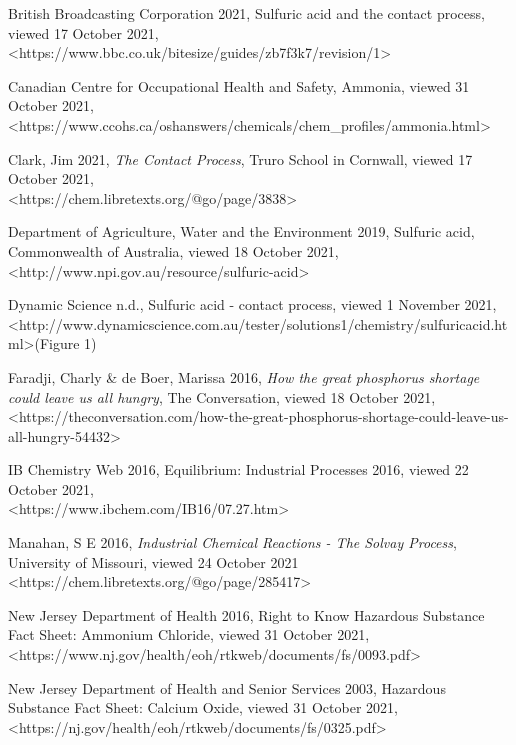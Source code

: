 \documentclass[12pt, a4paper]{article}
\begin{document}
British Broadcasting Corporation 2021, Sulfuric acid and the contact process, viewed 17 October 2021, \\ \textless{https://www.bbc.co.uk/bitesize/guides/zb7f3k7/revision/1}\textgreater

Canadian Centre for Occupational Health and Safety, Ammonia, viewed 31 October 2021, \\ \textless{https://www.ccohs.ca/oshanswers/chemicals/chem\_profiles/ammonia.html}\textgreater

Clark, Jim 2021, \emph{The Contact Process}, Truro School in Cornwall, viewed 17 October 2021, \\ \textless{https://chem.libretexts.org/@go/page/3838}\textgreater

Department of Agriculture, Water and the Environment 2019, Sulfuric acid, Commonwealth of Australia, viewed 18 October 2021, \textless{http://www.npi.gov.au/resource/sulfuric-acid}\textgreater

Dynamic Science n.d., Sulfuric acid - contact process, viewed 1 November 2021, \textless{http://www.dynamicscience.com.au/tester/solutions1/chemistry/sulfuricacid.html}\textgreater (Figure 1)

Faradji, Charly \& de Boer, Marissa 2016, \emph{How the great phosphorus shortage could leave us all hungry}, The Conversation, viewed 18 October 2021, \\ \textless{https://theconversation.com/how-the-great-phosphorus-shortage-could-leave-us-all-hungry-54432}\textgreater

IB Chemistry Web 2016, Equilibrium: Industrial Processes 2016, viewed 22 October 2021, \\ \textless{https://www.ibchem.com/IB16/07.27.htm}\textgreater

Manahan, S E 2016, \emph{Industrial Chemical Reactions - The Solvay Process}, University of Missouri, viewed 24 October 2021 \\ \textless{https://chem.libretexts.org/@go/page/285417}\textgreater

New Jersey Department of Health 2016, Right to Know Hazardous Substance Fact Sheet: Ammonium Chloride, viewed 31 October 2021, \\ \textless{https://www.nj.gov/health/eoh/rtkweb/documents/fs/0093.pdf}\textgreater

New Jersey Department of Health and Senior Services 2003, Hazardous Substance Fact Sheet: Calcium Oxide, viewed 31 October 2021, \\ \textless{https://nj.gov/health/eoh/rtkweb/documents/fs/0325.pdf}\textgreater
\end{document}
